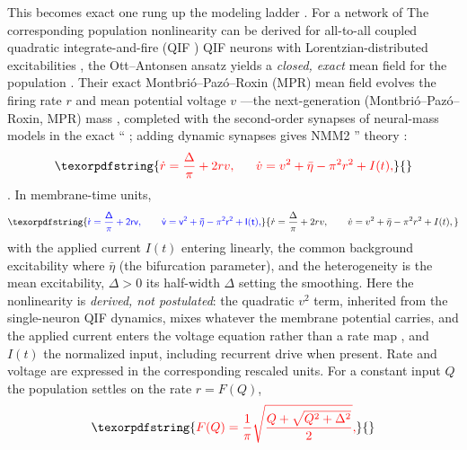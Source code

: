 \documentclass[11pt,a4paper]{article}
\providecommand{\DIFaddtex}[1]{{\protect\color{blue} \sf #1}} %
\providecommand{\DIFdeltex}[1]{{\protect\color{red} \scriptsize #1}} %
\providecommand{\DIFaddbegin}{} %
\providecommand{\DIFaddend}{} %
\providecommand{\DIFdelbegin}{} %
\providecommand{\DIFdelend}{} %
\providecommand{\DIFadd}[1]{\texorpdfstring{\DIFaddtex{#1}}{#1}} %
\providecommand{\DIFdel}[1]{\texorpdfstring{\DIFdeltex{#1}}{}} %
\begin{document}
\DIFdelbegin \DIFdel{This becomes exact one rung up the modeling ladder \cite{ruffini2025rosetta}. For a
network of }\DIFdelend \DIFaddbegin \DIFadd{The corresponding population nonlinearity can be derived for }\DIFaddend all-to-all coupled
\DIFdelbegin \DIFdel{quadratic integrate-and-fire (QIF ) }\DIFdelend \DIFaddbegin \DIFadd{QIF }\DIFaddend neurons with Lorentzian-distributed excitabilities\DIFdelbegin \DIFdel{, the Ott--Antonsen ansatz yields a
\emph{closed, exact} mean field for the population }\DIFdelend \DIFaddbegin \DIFadd{. Their exact
Montbri\'o--Paz\'o--Roxin (MPR) mean field evolves the }\DIFaddend firing rate $r$ and mean \DIFdelbegin \DIFdel{potential }\DIFdelend \DIFaddbegin \DIFadd{voltage
}\DIFaddend $v$ \DIFdelbegin \DIFdel{---the next-generation (Montbri\'o--Paz\'o--Roxin, MPR) mass
\cite{montbrio2015}, completed with the second-order synapses of neural-mass models
in the exact ``}\DIFdelend \DIFaddbegin \DIFadd{\cite{montbrio2015}; adding dynamic synapses gives }\DIFaddend NMM2
\DIFdelbegin \DIFdel{'' theory \cite{ruffini2021nmm2,clusella2023}:
}\begin{displaymath}
\DIFdel{\dot r=\frac{\Delta}{\pi}+2rv,\qquad
\dot v=v^2+\bar\eta-\pi^2 r^2+I(t),
}\end{displaymath}%
\DIFdelend \DIFaddbegin \DIFadd{\cite{ruffini2021nmm2,clusella2023}. In membrane-time units,
}\begin{equation}
\DIFadd{\dot r=\frac{\Delta}{\pi}+2rv,\qquad
\dot v=v^2+\bar\eta-\pi^2r^2+I(t),
\label{eq:mpr}
}\end{equation}\DIFaddend
\DIFdelbegin \DIFdel{with the applied current $I(t)$ entering linearly,
the common background excitability
}\DIFdelend \DIFaddbegin \DIFadd{where }\DIFaddend $\bar\eta$ \DIFdelbegin \DIFdel{(the bifurcation parameter), and the heterogeneity }\DIFdelend \DIFaddbegin \DIFadd{is the mean excitability, $\Delta>0$ its }\DIFaddend half-width\DIFdelbegin \DIFdel{$\Delta$ setting the smoothing. Here the nonlinearity is \emph{derived, not postulated}: the quadratic $v^2$ term, inherited from the
single-neuron QIF dynamics, mixes whatever the membrane potential
carries, and the applied current enters the voltage equation rather than a rate map}\DIFdelend \DIFaddbegin \DIFadd{, and $I(t)$ the
normalized input, including recurrent drive when present. Rate and voltage are
expressed in the corresponding rescaled units}\DIFaddend . For a constant \DIFdelbegin \DIFdel{input $Q$ the population settles on the rate $r=F(Q)$, }\begin{displaymath}
\DIFdel{F(Q)=\frac{1}{\pi}\sqrt{\frac{Q+\sqrt{Q^2+\Delta^2}}{2}},
}\end{displaymath}%
\end{document}
